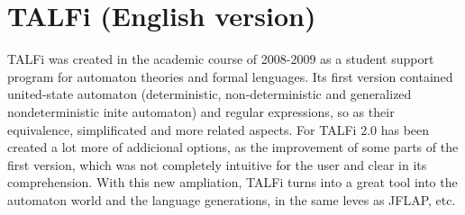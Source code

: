 \documentclass[12pt,a4paper,spanish]{book}
\newcommand{\clearemptydoublepage}{\newpage{\pagestyle{empty}
\cleardoublepage}}
\begin{document}
\section{TALFi (English version)}
TALFi was created in the academic course of 2008-2009 as a student support program for automaton theories and formal lenguages. Its first version contained united-state automaton (deterministic, non-deterministic and generalized nondeterministic inite automaton) and regular expressions, so as their equivalence, simplificated and more related aspects. For TALFi 2.0 has
been created a lot more of addicional options, as the improvement of some
parts of the first version, which was not completely intuitive for the user and
clear in its comprehension. With this new ampliation, TALFi turns into a
great tool into the automaton world and the language generations, in the
same leves as JFLAP, etc.


\clearemptydoublepage
\end{document}
